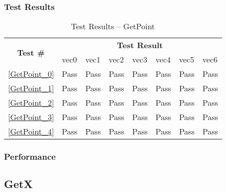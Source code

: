 \documentclass[12pt]{article}
\begin{document}
	\subsubsection{Test Results}
		\begin{table}[H]
		\centering
		\caption{Test Results -- GetPoint}\label{GetPoint_acc}
		\begin{tabular}{clllllll}
		\toprule
		\multirow{2}{*}{\bf Test \#} & \multicolumn{7}{c}{\bf Test Result}\\
		& vec0 & vec1 & vec2 & vec3 & vec4 & vec5 & vec6\\\midrule
		\ref{GetPoint_0} & Pass & Pass & Pass & Pass & Pass & Pass & Pass\\
		\ref{GetPoint_1} & Pass & Pass & Pass & Pass & Pass & Pass & Pass\\
		\ref{GetPoint_2} & Pass & Pass & Pass & Pass & Pass & Pass & Pass\\
		\ref{GetPoint_3} & Pass & Pass & Pass & Pass & Pass & Pass & Pass\\
		\ref{GetPoint_4} & Pass & Pass & Pass & Pass & Pass & Pass & Pass\\
		\bottomrule
		\end{tabular}
		\end{table}

	\subsubsection{Performance}

\subsection{GetX} %
\end{document}
